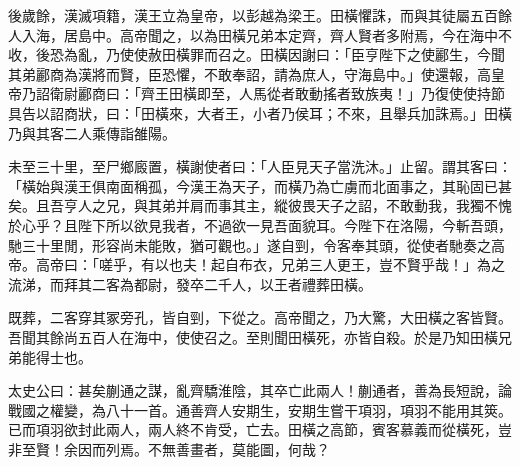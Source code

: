 \begin{pinyinscope}
後歲餘，漢滅項籍，漢王立為皇帝，以彭越為梁王。田橫懼誅，而與其徒屬五百餘人入海，居島中。高帝聞之，以為田橫兄弟本定齊，齊人賢者多附焉，今在海中不收，後恐為亂，乃使使赦田橫罪而召之。田橫因謝曰：「臣亨陛下之使酈生，今聞其弟酈商為漢將而賢，臣恐懼，不敢奉詔，請為庶人，守海島中。」使還報，高皇帝乃詔衛尉酈商曰：「齊王田橫即至，人馬從者敢動搖者致族夷！」乃復使使持節具告以詔商狀，曰：「田橫來，大者王，小者乃侯耳；不來，且舉兵加誅焉。」田橫乃與其客二人乘傳詣雒陽。

未至三十里，至尸鄉廄置，橫謝使者曰：「人臣見天子當洗沐。」止留。謂其客曰：「橫始與漢王俱南面稱孤，今漢王為天子，而橫乃為亡虜而北面事之，其恥固已甚矣。且吾亨人之兄，與其弟并肩而事其主，縱彼畏天子之詔，不敢動我，我獨不愧於心乎？且陛下所以欲見我者，不過欲一見吾面貌耳。今陛下在洛陽，今斬吾頭，馳三十里閒，形容尚未能敗，猶可觀也。」遂自剄，令客奉其頭，從使者馳奏之高帝。高帝曰：「嗟乎，有以也夫！起自布衣，兄弟三人更王，豈不賢乎哉！」為之流涕，而拜其二客為都尉，發卒二千人，以王者禮葬田橫。

既葬，二客穿其冢旁孔，皆自剄，下從之。高帝聞之，乃大驚，大田橫之客皆賢。吾聞其餘尚五百人在海中，使使召之。至則聞田橫死，亦皆自殺。於是乃知田橫兄弟能得士也。

太史公曰：甚矣蒯通之謀，亂齊驕淮陰，其卒亡此兩人！蒯通者，善為長短說，論戰國之權變，為八十一首。通善齊人安期生，安期生嘗干項羽，項羽不能用其筴。已而項羽欲封此兩人，兩人終不肯受，亡去。田橫之高節，賓客慕義而從橫死，豈非至賢！余因而列焉。不無善畫者，莫能圖，何哉？


\end{pinyinscope}